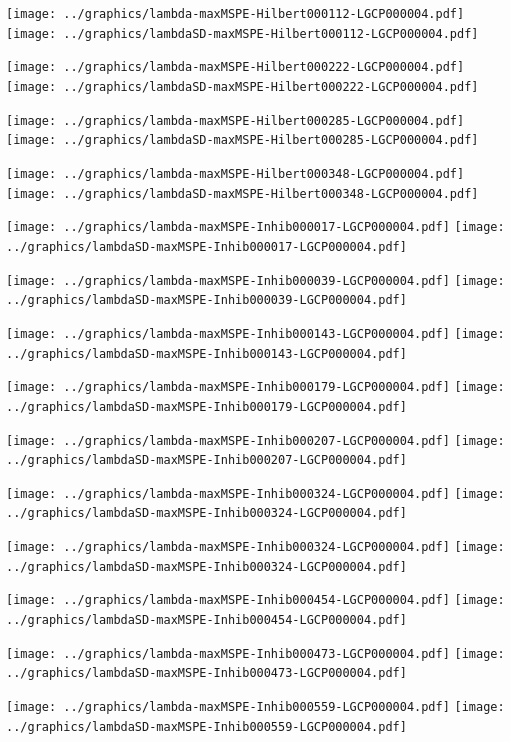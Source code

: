 \documentclass[review]{elsarticle}
\begin{document}
\texttt{[image: ../graphics/lambda-maxMSPE-Hilbert000112-LGCP000004.pdf]}
\texttt{[image: ../graphics/lambdaSD-maxMSPE-Hilbert000112-LGCP000004.pdf]}

\texttt{[image: ../graphics/lambda-maxMSPE-Hilbert000222-LGCP000004.pdf]}
\texttt{[image: ../graphics/lambdaSD-maxMSPE-Hilbert000222-LGCP000004.pdf]}

\texttt{[image: ../graphics/lambda-maxMSPE-Hilbert000285-LGCP000004.pdf]}
\texttt{[image: ../graphics/lambdaSD-maxMSPE-Hilbert000285-LGCP000004.pdf]}

\texttt{[image: ../graphics/lambda-maxMSPE-Hilbert000348-LGCP000004.pdf]}
\texttt{[image: ../graphics/lambdaSD-maxMSPE-Hilbert000348-LGCP000004.pdf]}

\texttt{[image: ../graphics/lambda-maxMSPE-Inhib000017-LGCP000004.pdf]}
\texttt{[image: ../graphics/lambdaSD-maxMSPE-Inhib000017-LGCP000004.pdf]}

\texttt{[image: ../graphics/lambda-maxMSPE-Inhib000039-LGCP000004.pdf]}
\texttt{[image: ../graphics/lambdaSD-maxMSPE-Inhib000039-LGCP000004.pdf]}

\texttt{[image: ../graphics/lambda-maxMSPE-Inhib000143-LGCP000004.pdf]}
\texttt{[image: ../graphics/lambdaSD-maxMSPE-Inhib000143-LGCP000004.pdf]}

\texttt{[image: ../graphics/lambda-maxMSPE-Inhib000179-LGCP000004.pdf]}
\texttt{[image: ../graphics/lambdaSD-maxMSPE-Inhib000179-LGCP000004.pdf]}

\texttt{[image: ../graphics/lambda-maxMSPE-Inhib000207-LGCP000004.pdf]}
\texttt{[image: ../graphics/lambdaSD-maxMSPE-Inhib000207-LGCP000004.pdf]}

\texttt{[image: ../graphics/lambda-maxMSPE-Inhib000324-LGCP000004.pdf]}
\texttt{[image: ../graphics/lambdaSD-maxMSPE-Inhib000324-LGCP000004.pdf]}

\texttt{[image: ../graphics/lambda-maxMSPE-Inhib000324-LGCP000004.pdf]}
\texttt{[image: ../graphics/lambdaSD-maxMSPE-Inhib000324-LGCP000004.pdf]}

\texttt{[image: ../graphics/lambda-maxMSPE-Inhib000454-LGCP000004.pdf]}
\texttt{[image: ../graphics/lambdaSD-maxMSPE-Inhib000454-LGCP000004.pdf]}

\texttt{[image: ../graphics/lambda-maxMSPE-Inhib000473-LGCP000004.pdf]}
\texttt{[image: ../graphics/lambdaSD-maxMSPE-Inhib000473-LGCP000004.pdf]}

\texttt{[image: ../graphics/lambda-maxMSPE-Inhib000559-LGCP000004.pdf]}
\texttt{[image: ../graphics/lambdaSD-maxMSPE-Inhib000559-LGCP000004.pdf]}
\end{document}

